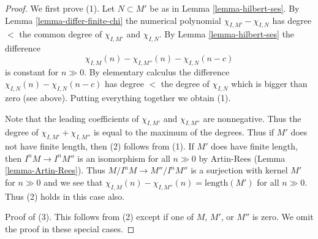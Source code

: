 \documentclass[10pt,a4paper]{amsart}
\theoremstyle{plain}
\theoremstyle{definition}
\theoremstyle{remark}
\numberwithin{equation}{subsection}
\begin{document}
\begin{proof}
We first prove (1). Let $N \subset M'$ be as in Lemma \ref{lemma-hilbert-ses}.
By Lemma \ref{lemma-differ-finite-chi} the numerical polynomial
$\chi_{I, M'} - \chi_{I, N}$ has degree $<$ the common degree of
$\chi_{I, M'}$ and $\chi_{I, N}$. By Lemma \ref{lemma-hilbert-ses}
the difference
$$
\chi_{I, M}(n) - \chi_{I, M''}(n) - \chi_{I, N}(n - c)
$$
is constant for $n \gg 0$. By elementary calculus the difference
$\chi_{I, N}(n) - \chi_{I, N}(n - c)$ has degree $<$ the degree of
$\chi_{I, N}$ which is bigger than zero (see above). Putting everything
together we obtain (1).

\medskip\noindent
Note that the leading coefficients of $\chi_{I, M'}$ and $\chi_{I, M''}$ are
nonnegative. Thus the degree of $\chi_{I, M'} + \chi_{I, M''}$ is equal
to the maximum of the degrees. Thus if $M'$ does not have finite
length, then (2) follows from (1). If $M'$ does have finite length, then
$I^nM \to I^nM''$ is an isomorphism for all $n \gg 0$ by Artin-Rees
(Lemma \ref{lemma-Artin-Rees}). Thus $M/I^nM \to M''/I^nM''$ is a
surjection with kernel $M'$ for $n \gg 0$ and we see that
$\chi_{I, M}(n) - \chi_{I, M''}(n) = \text{length}(M')$
for all $n \gg 0$. Thus (2) holds in this case also.

\medskip\noindent
Proof of (3). This follows from (2) except if one of $M$, $M'$, or $M''$
is zero. We omit the proof in these special cases.
\end{proof}
\end{document}

